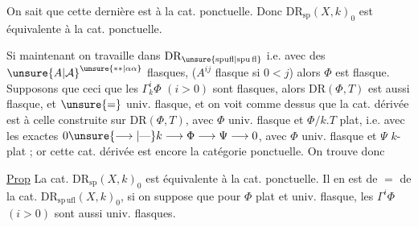 On sait que cette dernière est  à la cat. ponctuelle. Donc $\mathrm{DR}_{\mathrm{sp}}(X,k)_0$ est équivalente à la cat. ponctuelle.

Si maintenant on travaille dans $\mathrm{DR}_{\unsure{\mathrm{spufl}|\mathrm{spu\,fl}}}$  i.e. avec des $\unsure{A|\mathcal A}^{\unsure{**|\alpha\alpha}}$  flasques, ($A^{ij}$  flasque si $0<j$) alors $\Phi$ est  flasque. 
Supposons que ceci  que les $\Gamma_k^{i}\Phi$ $(i>0)$ sont  flasques, alors $\mathrm{DR}(\Phi,T)$ est aussi flasque,  et $\unsure{=}$ univ. flasque, et on voit comme dessus que la cat. dérivée est  à celle construite sur  $\mathrm{DR}(\Phi,T)$, avec $\Phi$ univ. flasque et $\Phi/k.T$ plat, i.e. avec les  exactes $0\unsure{\longrightarrow|\text{---}} k\longrightarrow\Phi\longrightarrow\Psi\longrightarrow0$, avec $\Phi$ univ. flasque et $\Psi$ $k$-plat ; or cette cat. dérivée est encore la catégorie ponctuelle. On trouve donc

\uline{Prop} La cat. $\mathrm{DR}_{\mathrm{sp}}(X,k)_0$ est équivalente à la cat. ponctuelle. Il en est de $=$ de la cat. $\mathrm{DR}_{\mathrm{sp\,ufl}}(X,k)_0$, si on suppose que pour   $\Phi$ plat et univ. flasque, les $\Gamma^i\Phi$ $(i>0)$ sont aussi univ. flasques.
